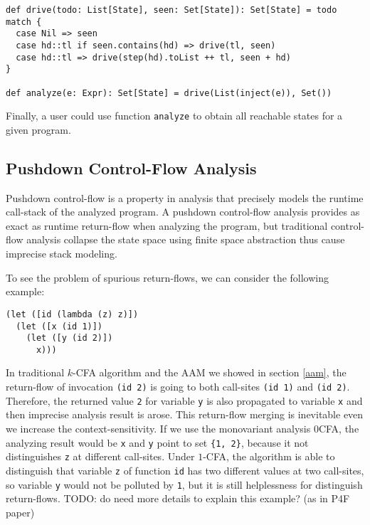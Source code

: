 \documentclass[acmsmall,review,anonymous]{acmart}\settopmatter{printfolios=true,printccs=false,printacmref=false}
\begin{document}
\begin{verbatim}
def drive(todo: List[State], seen: Set[State]): Set[State] = todo match {
  case Nil => seen
  case hd::tl if seen.contains(hd) => drive(tl, seen)
  case hd::tl => drive(step(hd).toList ++ tl, seen + hd)
}

def analyze(e: Expr): Set[State] = drive(List(inject(e)), Set())
\end{verbatim}

Finally, a user could use function \texttt{analyze} to obtain all reachable states 
for a given program.


\subsection{Pushdown Control-Flow Analysis}

Pushdown control-flow is a property in analysis that precisely models
the runtime call-stack of the analyzed program. 
A pushdown control-flow analysis provides as exact as runtime return-flow 
when analyzing the program, but traditional control-flow analysis collapse 
the state space using finite space abstraction thus cause imprecise stack modeling.

To see the problem of spurious return-flows, we can consider the following example:

\begin{verbatim}
(let ([id (lambda (z) z)])
  (let ([x (id 1)])
    (let ([y (id 2)])
      x)))
\end{verbatim}

In traditional $k$-CFA algorithm and the AAM we showed in section \ref{aam}, 
the return-flow of invocation \texttt{(id 2)} 
is going to both call-sites \texttt{(id 1)} and \texttt{(id 2)}. Therefore, the
returned value \texttt{2} for variable \texttt{y} is also propagated to 
variable \texttt{x} and then imprecise analysis result is arose.
This return-flow merging is inevitable even we increase the context-sensitivity.
If we use the monovariant analysis 0CFA, the analyzing result would be \texttt{x} and 
\texttt{y} point to set \texttt{\{1, 2\}}, because it not distinguishes
\texttt{z} at different call-sites.
Under $1$-CFA, the algorithm is able to distinguish that variable \texttt{z} of function
\texttt{id} has two different values at two call-sites, so variable \texttt{y} 
would not be polluted by \texttt{1}, but it is still helplessness for distinguish
return-flows.
TODO: do need more details to explain this example? (as in P4F paper)
\end{document}
